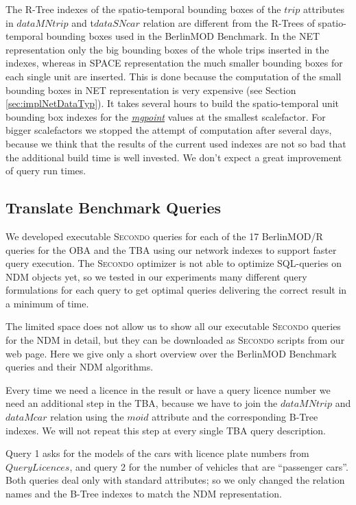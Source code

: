 \documentclass[a4paper]{article}
\newcommand{\secondo}{\textsc{Secondo}}
\newcommand{\bmodb} {BerlinMOD Benchmark}
\newcommand{\dt}[1]{\textsl{\underline{#1}}}
\begin{document}
The R-Tree indexes of the spatio-temporal bounding boxes of the $trip$ attributes
in $dataMNtrip$ and t$dataSNcar$ relation are different from the
R-Trees of spatio-temporal bounding boxes used in the \bmodb{}.
In the NET representation only the big bounding boxes of the whole trips inserted
in the indexes, whereas in SPACE  representation the much smaller bounding boxes
for each single unit are inserted. This is done because the computation of the
small bounding boxes in NET representation is very expensive (see Section
\ref{sec:implNetDataTyp}). It takes several hours to build the spatio-temporal
unit bounding box indexes for the \dt{mgpoint}  values at the smallest scalefactor.
For bigger scalefactors we stopped the attempt of computation after several days,
because we think that the results of the current used indexes are not so bad that
the additional build time is well invested. We don't expect a great improvement
of query run times.
\subsection{Translate Benchmark Queries}
\label{sec:queries}
We developed executable \secondo{} queries for each of the 17 BerlinMOD/R queries
for the OBA and the TBA using our network indexes to support faster query execution.
The \secondo{} optimizer is not able to optimize SQL-queries on NDM objects yet, so we tested in
our experiments many different query formulations for each query to get optimal
queries delivering the correct result in a minimum of time.

The limited space does not allow us to show all our executable \secondo{} queries
for the NDM in detail, but they can be downloaded as \secondo{} scripts
from our web page. Here we give only a short overview over the \bmodb{} queries
and their NDM algorithms.

Every time we need a licence in the result or have a query licence number we need
an additional step in the TBA, because we have to join the $dataMNtrip$ and $dataMcar$
relation using the $moid$ attribute and the corresponding B-Tree indexes.
We will not repeat this step at every single TBA query description.

Query 1 asks for the models of the cars with licence plate numbers from $QueryLicences$,
and query 2 for the number of vehicles that are ``passenger cars''. Both queries
deal only with standard attributes; so we only changed the relation names and the
B-Tree indexes to match the NDM representation.
\end{document}
